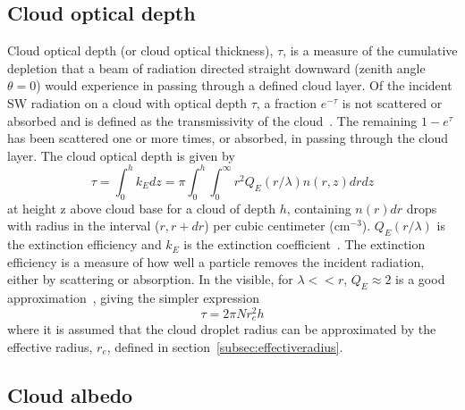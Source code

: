 \subsection{Cloud optical depth}
\label{subsec:cloudoptdep}
Cloud optical depth (or cloud optical thickness), $\tau$, is a measure of the cumulative depletion that a beam of radiation directed straight downward (zenith angle $\theta = 0$) would experience in passing through a defined cloud layer. Of the incident SW radiation on a cloud with optical depth $\tau$, a fraction $e^{-\tau}$ is not scattered or absorbed and is defined as the transmissivity of the cloud~\citep{Wallace2006}. The remaining $1-e^{\tau}$ has been scattered one or more times, or absorbed, in passing through the cloud layer. The cloud optical depth is given by~\citep{Twomey1977}
\begin{equation}
\tau = \int_0^h k_{E}dz = \pi \int_0^h \int_0^{\infty} r^2 Q_E(r/\lambda) n(r,z) dr dz
\end{equation}
at height z above cloud base for a cloud of depth $h$, containing $n(r)dr$ drops with radius in the interval ($r, r + dr$) per cubic centimeter ($\text{cm}^{-3}$). $Q_E(r/\lambda)$ is the extinction efficiency and $k_{E}$ is the extinction coefficient~\citep{Twomey1977}. The extinction efficiency is a measure of how well a particle removes the incident radiation, either by scattering or absorption. In the visible, for $\lambda<<r$, $Q_E\approx 2$ is a good approximation~\citep{Hobbs1993}, giving the simpler expression
\begin{equation}
\tau = 2\pi N r_e^2 h
\label{eqn:cloudtau1}
\end{equation}
where it is assumed that the cloud droplet radius can be approximated by the effective radius, $r_e$, defined in section~\ref{subsec:effectiveradius}.

\subsection{Cloud albedo}

